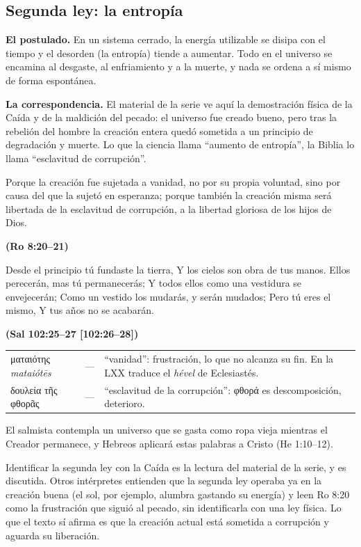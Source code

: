 \documentclass[11pt,letterpaper]{article}
\newcommand{\grc}[1]{\foreignlanguage{ancientgreek}{#1}}
\newcommand{\fuente}[1]{\par\hfill{\upshape\bfseries\small\textcolor{azul}{#1}}}
\begin{document}
\subsection{Segunda ley: la entropía}
\textbf{El postulado.} En un sistema cerrado, la energía utilizable se disipa con el tiempo y el desorden (la entropía) tiende a aumentar. Todo en el universo se encamina al desgaste, al enfriamiento y a la muerte, y nada se ordena a sí mismo de forma espontánea.

\textbf{La correspondencia.} El material de la serie ve aquí la demostración física de la Caída y de la maldición del pecado: el universo fue creado bueno, pero tras la rebelión del hombre la creación entera quedó sometida a un principio de degradación y muerte. Lo que la ciencia llama ``aumento de entropía'', la Biblia lo llama ``esclavitud de corrupción''.

\begin{cita}Porque la creación fue sujetada a vanidad, no por su propia voluntad, sino por causa del que la sujetó en esperanza; porque también la creación misma será libertada de la esclavitud de corrupción, a la libertad gloriosa de los hijos de Dios.\fuente{(Ro 8:20--21)}\end{cita}
\begin{cita}Desde el principio tú fundaste la tierra, Y los cielos son obra de tus manos. Ellos perecerán, mas tú permanecerás; Y todos ellos como una vestidura se envejecerán; Como un vestido los mudarás, y serán mudados; Pero tú eres el mismo, Y tus años no se acabarán.\fuente{(Sal 102:25--27 [102:26--28])}\end{cita}

\begin{filologia}[Ro 8:20--21]
\begin{tabular}{@{}L{3.2cm}L{1.6cm}L{10cm}@{}}
\grc{ματαιότης} \emph{mataiótēs} & --- & ``vanidad'': frustración, lo que no alcanza su fin. En la LXX traduce el \emph{hével} de Eclesiastés. \\[2pt]
\grc{δουλεία τῆς φθορᾶς} & --- & ``esclavitud de la corrupción'': \grc{φθορά} es descomposición, deterioro. \\
\end{tabular}
\end{filologia}

El salmista contempla un universo que se gasta como ropa vieja mientras el Creador permanece, y Hebreos aplicará estas palabras a Cristo (He 1:10--12).

\begin{nota}[Precisión]
Identificar la segunda ley con la Caída es la lectura del material de la serie, y es discutida. Otros intérpretes entienden que la segunda ley operaba ya en la creación buena (el sol, por ejemplo, alumbra gastando su energía) y leen Ro 8:20 como la frustración que siguió al pecado, sin identificarla con una ley física. Lo que el texto sí afirma es que la creación actual está sometida a corrupción y aguarda su liberación.
\end{nota}
\end{document}
